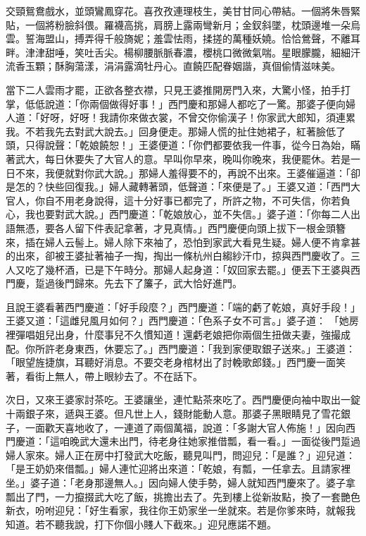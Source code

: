 交頸鴛鴦戲水，並頭鸞鳳穿花。喜孜孜連理枝生，美甘甘同心帶結。一個將朱唇緊貼，一個將粉臉斜偎。羅襪高挑，肩膀上露兩彎新月；金釵斜墜，枕頭邊堆一朵烏雲。誓海盟山，搏弄得千般旖妮；羞雲怯雨，揉搓的萬種妖嬈。恰恰鶯聲，不離耳畔。津津甜唾，笑吐舌尖。楊柳腰脈脈春濃，櫻桃口微微氣喘。星眼朦朧，細細汗流香玉顆；酥胸蕩漾，涓涓露滴牡丹心。直饒匹配眷姻諧，真個偷情滋味美。

當下二人雲雨才罷，正欲各整衣襟，只見王婆推開房門入來，大驚小怪，拍手打掌，低低說道：「你兩個做得好事！」西門慶和那婦人都吃了一驚。那婆子便向婦人道：「好呀，好呀！我請你來做衣裳，不曾交你偷漢子！你家武大郎知，須連累我。不若我先去對武大說去。」回身便走。那婦人慌的扯住她裙子，紅著臉低了頭，只得說聲：「乾娘饒恕！」王婆便道：「你們都要依我一件事，從今日為始，瞞著武大，每日休要失了大官人的意。早叫你早來，晚叫你晚來，我便罷休。若是一日不來，我便就對你武大說。」那婦人羞得要不的，再說不出來。王婆催逼道：「卻是怎的？快些回復我。」婦人藏轉著頭，低聲道：「來便是了。」王婆又道：「西門大官人，你自不用老身說得，這十分好事已都完了，所許之物，不可失信，你若負心，我也要對武大說。」西門慶道：「乾娘放心，並不失信。」婆子道：「你每二人出語無憑，要各人留下件表記拿著，才見真情。」西門慶便向頭上拔下一根金頭簪來，插在婦人云髻上。婦人除下來袖了，恐怕到家武大看見生疑。婦人便不肯拿甚的出來，卻被王婆扯著袖子一掏，掏出一條杭州白縐紗汗巾，掠與西門慶收了。三人又吃了幾杯酒，已是下午時分。那婦人起身道：「奴回家去罷。」便丟下王婆與西門慶，踅過後門歸來。先去下了簾子，武大恰好進門。

且說王婆看著西門慶道：「好手段麼？」西門慶道：「端的虧了乾娘，真好手段！」王婆又道：「這雌兒風月如何？」西門慶道：「色系子女不可言。」婆子道： 「她房裡彈唱姐兒出身，什麼事兒不久慣知道！還虧老娘把你兩個生扭做夫妻，強撮成配。你所許老身東西，休要忘了。」西門慶道：「我到家便取銀子送來。」王婆道：「眼望旌捷旗，耳聽好消息。不要交老身棺材出了討輓歌郎錢。」西門慶一面笑著，看街上無人，帶上眼紗去了。不在話下。

次日，又來王婆家討茶吃。王婆讓坐，連忙點茶來吃了。西門慶便向袖中取出一錠十兩銀子來，遞與王婆。但凡世上人，錢財能動人意。那婆子黑眼睛見了雪花銀子，一面歡天喜地收了，一連道了兩個萬福，說道：「多謝大官人佈施！」因向西門慶道：「這咱晚武大還未出門，待老身往她家推借瓢，看一看。」一面從後門踅過婦人家來。婦人正在房中打發武大吃飯，聽見叫門，問迎兒：「是誰？」迎兒道：「是王奶奶來借瓢。」婦人連忙迎將出來道：「乾娘，有瓢，一任拿去。且請家裡坐。」婆子道：「老身那邊無人。」因向婦人使手勢，婦人就知西門慶來了。婆子拿瓢出了門，一力攛掇武大吃了飯，挑擔出去了。先到樓上從新妝點，換了一套艷色新衣，吩咐迎兒：「好生看家，我往你王奶家坐一坐就來。若是你爹來時，就報我知道。若不聽我說，打下你個小賤人下截來。」迎兒應諾不題。

